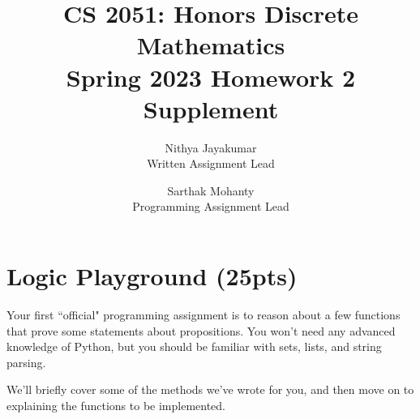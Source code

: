 \documentclass{article}
\title{\vspace{-1cm}CS 2051: Honors Discrete Mathematics \\Spring 2023 Homework 2 Supplement}
\author{Nithya Jayakumar \\ \small{Written Assignment Lead}
\and Sarthak Mohanty \\ \small{Programming Assignment Lead}}
\date{}
\begin{document}
\maketitle

\section*{Logic Playground (25pts)}

    Your first ``official" programming assignment is to reason about a few functions that prove some statements about propositions. You won't need any advanced knowledge of Python, but you should be familiar with sets, lists, and string parsing.

    \vspace{3mm}
    We'll briefly cover some of the methods we've wrote for you, and then move on to explaining the functions to be implemented.
\end{document}
